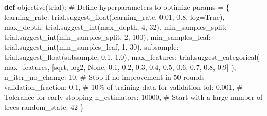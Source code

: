 \documentclass[
  letterpaper,
  DIV=11,
  numbers=noendperiod]{scrreprt}
\newenvironment{Shaded}{\begin{snugshade}}{\end{snugshade}}
\newcommand{\CommentTok}[1]{\textcolor[rgb]{0.37,0.37,0.37}{#1}}
\newcommand{\DecValTok}[1]{\textcolor[rgb]{0.68,0.00,0.00}{#1}}
\newcommand{\FloatTok}[1]{\textcolor[rgb]{0.68,0.00,0.00}{#1}}
\newcommand{\KeywordTok}[1]{\textcolor[rgb]{0.00,0.23,0.31}{\textbf{#1}}}
\newcommand{\NormalTok}[1]{\textcolor[rgb]{0.00,0.23,0.31}{#1}}
\newcommand{\OperatorTok}[1]{\textcolor[rgb]{0.37,0.37,0.37}{#1}}
\newcommand{\StringTok}[1]{\textcolor[rgb]{0.13,0.47,0.30}{#1}}
\newcommand{\VariableTok}[1]{\textcolor[rgb]{0.07,0.07,0.07}{#1}}
\begin{document}
\begin{Shaded}
\begin{Highlighting}[]
\KeywordTok{def}\NormalTok{ objective(trial):}
    \CommentTok{\# Define hyperparameters to optimize}
\NormalTok{    params }\OperatorTok{=}\NormalTok{ \{}
        \StringTok{\textquotesingle{}learning\_rate\textquotesingle{}}\NormalTok{: trial.suggest\_float(}\StringTok{\textquotesingle{}learning\_rate\textquotesingle{}}\NormalTok{, }\FloatTok{0.01}\NormalTok{, }\FloatTok{0.8}\NormalTok{, log}\OperatorTok{=}\VariableTok{True}\NormalTok{),}
        \StringTok{\textquotesingle{}max\_depth\textquotesingle{}}\NormalTok{: trial.suggest\_int(}\StringTok{\textquotesingle{}max\_depth\textquotesingle{}}\NormalTok{, }\DecValTok{4}\NormalTok{, }\DecValTok{32}\NormalTok{),}
        \StringTok{\textquotesingle{}min\_samples\_split\textquotesingle{}}\NormalTok{: trial.suggest\_int(}\StringTok{\textquotesingle{}min\_samples\_split\textquotesingle{}}\NormalTok{, }\DecValTok{2}\NormalTok{, }\DecValTok{100}\NormalTok{),}
        \StringTok{\textquotesingle{}min\_samples\_leaf\textquotesingle{}}\NormalTok{: trial.suggest\_int(}\StringTok{\textquotesingle{}min\_samples\_leaf\textquotesingle{}}\NormalTok{, }\DecValTok{1}\NormalTok{, }\DecValTok{30}\NormalTok{),}
        \StringTok{\textquotesingle{}subsample\textquotesingle{}}\NormalTok{: trial.suggest\_float(}\StringTok{\textquotesingle{}subsample\textquotesingle{}}\NormalTok{, }\FloatTok{0.1}\NormalTok{, }\FloatTok{1.0}\NormalTok{),}
        \StringTok{\textquotesingle{}max\_features\textquotesingle{}}\NormalTok{: trial.suggest\_categorical(}
            \StringTok{\textquotesingle{}max\_features\textquotesingle{}}\NormalTok{, }
\NormalTok{            [}\StringTok{\textquotesingle{}sqrt\textquotesingle{}}\NormalTok{, }\StringTok{\textquotesingle{}log2\textquotesingle{}}\NormalTok{, }\VariableTok{None}\NormalTok{, }\FloatTok{0.1}\NormalTok{, }\FloatTok{0.2}\NormalTok{, }\FloatTok{0.3}\NormalTok{, }\FloatTok{0.4}\NormalTok{, }\FloatTok{0.5}\NormalTok{, }\FloatTok{0.6}\NormalTok{, }\FloatTok{0.7}\NormalTok{, }\FloatTok{0.8}\NormalTok{, }\FloatTok{0.9}\NormalTok{]}
\NormalTok{        ),}
        \StringTok{\textquotesingle{}n\_iter\_no\_change\textquotesingle{}}\NormalTok{: }\DecValTok{10}\NormalTok{,  }\CommentTok{\# Stop if no improvement in 50 rounds}
        \StringTok{\textquotesingle{}validation\_fraction\textquotesingle{}}\NormalTok{: }\FloatTok{0.1}\NormalTok{,  }\CommentTok{\# 10\% of training data for validation}
        \StringTok{\textquotesingle{}tol\textquotesingle{}}\NormalTok{: }\FloatTok{0.001}\NormalTok{,  }\CommentTok{\# Tolerance for early stopping}
        \StringTok{\textquotesingle{}n\_estimators\textquotesingle{}}\NormalTok{: }\DecValTok{10000}\NormalTok{,  }\CommentTok{\# Start with a large number of trees}
        \StringTok{\textquotesingle{}random\_state\textquotesingle{}}\NormalTok{: }\DecValTok{42}
\NormalTok{    \}}


\end{Highlighting}
\end{Shaded}
\end{document}
